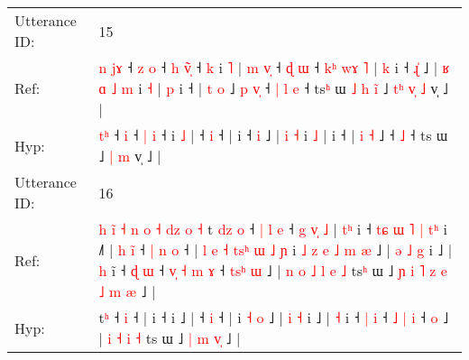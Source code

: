 \documentclass[10pt]{article}
\DeclareRobustCommand{\hl}[1]{{\textcolor{red}{#1}}}
\begin{document}
\begin{longtable}{ll}
\midrule
Utterance ID: & 15 \\
Ref: & \hl{n}\hl{ }\hl{j}\hl{ɤ} ˧\hl{ }\hl{z} \hl{o} ˧ \hl{h} \hl{v}\hl{̃}\hl{̩} ˧\hl{ }\hl{k} i \hl{˥} |\hl{ }\hl{m}\hl{ }\hl{v}\hl{̩} ˧\hl{ }\hl{ɖ} \hl{ɯ} ˧\hl{ }\hl{k}\hl{ʰ}\hl{ }\hl{w}\hl{ɤ}\hl{ }\hl{˥} |\hl{ }\hl{k} i ˧ \hl{ɻ}\hl{̍} ˩ |\hl{ }\hl{ʁ}\hl{ }\hl{ɑ} \hl{˩} \hl{m} i \hl{˧} |\hl{ }\hl{p} i ˧ | \hl{t} \hl{o} ˩\hl{ }\hl{p}\hl{ }\hl{v}\hl{̩} ˧\hl{ }\hl{|}\hl{ }\hl{l} \hl{e} ˧ ts\hl{ʰ} ɯ\hl{ }\hl{˩}\hl{ }\hl{h}\hl{ }\hl{i}\hl{̃} ˩\hl{ }\hl{t}\hl{ʰ} \hl{v}\hl{̩} \hl{˩} v̩ ˩ |
 \\
Hyp: & \hl{}\hl{}\hl{t}\hl{ʰ} ˧\hl{}\hl{} \hl{i} ˧ \hl{|} \hl{}\hl{}\hl{i} ˧\hl{}\hl{} i \hl{˩} |\hl{}\hl{}\hl{}\hl{}\hl{} ˧\hl{}\hl{} \hl{i} ˧\hl{}\hl{}\hl{}\hl{}\hl{}\hl{}\hl{}\hl{} |\hl{}\hl{} i ˧ \hl{}\hl{i} ˩ |\hl{}\hl{}\hl{}\hl{} \hl{i} \hl{˧} i \hl{˩} |\hl{}\hl{} i ˧ | \hl{i} \hl{˧} ˩\hl{}\hl{}\hl{}\hl{}\hl{} ˧\hl{}\hl{}\hl{}\hl{} \hl{˩} ˧ ts\hl{} ɯ\hl{}\hl{}\hl{}\hl{}\hl{}\hl{}\hl{} ˩\hl{}\hl{}\hl{} \hl{}\hl{|} \hl{m} v̩ ˩ |
 \\
\midrule
Utterance ID: & 16 \\
Ref: & \hl{h}\hl{ }\hl{i}\hl{̃}\hl{ }\hl{˧}\hl{ }\hl{n}\hl{ }\hl{o}\hl{ }\hl{˧}\hl{ }\hl{d}\hl{z}\hl{ }\hl{o}\hl{ }\hl{˧}\hl{ }t\hl{ }\hl{d}\hl{z}\hl{ }\hl{o} ˧\hl{ }\hl{|}\hl{ }\hl{l} \hl{e} ˧\hl{ }\hl{g}\hl{ }\hl{v}\hl{̩}\hl{ }\hl{˩} |\hl{ }\hl{t}\hl{ʰ} i ˧\hl{ }\hl{t}\hl{ɕ}\hl{ }\hl{ɯ}\hl{ }\hl{˥}\hl{ }\hl{|}\hl{ }\hl{t}\hl{ʰ} i ˩\hl{˥} |\hl{ }\hl{h}\hl{ }\hl{i}\hl{̃} ˧\hl{ }\hl{|}\hl{ }\hl{n} \hl{o} ˧ |\hl{ }\hl{l}\hl{ }\hl{e}\hl{ }\hl{˧}\hl{ }\hl{t}\hl{s}\hl{ʰ}\hl{ }\hl{ɯ}\hl{ }\hl{˩}\hl{ }\hl{ɲ} i\hl{ }\hl{˩}\hl{ }\hl{z}\hl{ }\hl{e}\hl{ }\hl{˩} \hl{m} \hl{æ} ˩ |\hl{ }\hl{ə} \hl{˩} \hl{g} i ˩ | \hl{h} i\hl{̃} ˧ \hl{ɖ} \hl{ɯ} ˧\hl{ }\hl{v}\hl{̩} \hl{˧} \hl{m} \hl{ɤ} ˧\hl{ }\hl{t}\hl{s}\hl{ʰ} \hl{ɯ} ˩ |\hl{ }\hl{n}\hl{ }\hl{o} \hl{˩} \hl{l} \hl{e} \hl{˩} ts\hl{ʰ} ɯ ˩\hl{ }\hl{ɲ}\hl{ }\hl{i}\hl{ }\hl{˥}\hl{ }\hl{z} \hl{e} \hl{˩} \hl{m}\hl{ }\hl{æ} ˩ |
 \\
Hyp: & \hl{}\hl{}\hl{}\hl{}\hl{}\hl{}\hl{}\hl{}\hl{}\hl{}\hl{}\hl{}\hl{}\hl{}\hl{}\hl{}\hl{}\hl{}\hl{}\hl{}t\hl{}\hl{}\hl{}\hl{}\hl{ʰ} ˧\hl{}\hl{}\hl{}\hl{} \hl{i} ˧\hl{}\hl{}\hl{}\hl{}\hl{}\hl{}\hl{} |\hl{}\hl{}\hl{} i ˧\hl{}\hl{}\hl{}\hl{}\hl{}\hl{}\hl{}\hl{}\hl{}\hl{}\hl{}\hl{} i ˩\hl{} |\hl{}\hl{}\hl{}\hl{}\hl{} ˧\hl{}\hl{}\hl{}\hl{} \hl{i} ˧ |\hl{}\hl{}\hl{}\hl{}\hl{}\hl{}\hl{}\hl{}\hl{}\hl{}\hl{}\hl{}\hl{}\hl{}\hl{}\hl{} i\hl{}\hl{}\hl{}\hl{}\hl{}\hl{}\hl{}\hl{} \hl{˧} \hl{o} ˩ |\hl{}\hl{} \hl{i} \hl{˧} i ˩ | \hl{˧} i\hl{} ˧ \hl{|} \hl{i} ˧\hl{}\hl{}\hl{} \hl{˩} \hl{|} \hl{i} ˧\hl{}\hl{}\hl{}\hl{} \hl{o} ˩ |\hl{}\hl{}\hl{}\hl{} \hl{i} \hl{˧} \hl{i} \hl{˧} ts\hl{} ɯ ˩\hl{}\hl{}\hl{}\hl{}\hl{}\hl{}\hl{}\hl{} \hl{|} \hl{m} \hl{}\hl{v}\hl{̩} ˩ |

\end{longtable}
\end{document}
